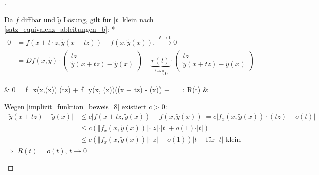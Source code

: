 \begin{proof}[]
\begin{enumerate}[label={\alph*)}]
		Da $f$ \gls{diffbar} und $\tilde{y}$ Lösung, gilt für $\vert t \vert$ klein nach  \ref{satz_equivalenz_ableitungen_b}: {\zeroAmsmathAlignVSpaces**\begin{align*}
			0 &= f(x + t\cdot z, \tilde{y}(x + tz)) - f(x,\tilde{y}(x)), \, \xrightarrow{t\to 0}0 \\
			&= Df(x,\tilde{y})\cdot \begin{pmatrix}tz \\ \tilde{y}(x+tz) - \tilde{y}(x)\end{pmatrix} + \underbrace{r(t)}_{\xrightarrow{t\to 0} 0}\cdot \begin{pmatrix}
				tz \\ \tilde{y}(x + tz) - \tilde{y}(x)
			\end{pmatrix}
		\end{align*}}
		{\zeroAmsmathAlignVSpaces\begin{flalign}
			\Rightarrow\;\; & 0 = f_x(x,(x)) \cdot(tz) + f_y(x, (x))\cdot ((x + tz) - (x)) + _{=: R(t)} &
		\end{flalign}}
		Wegen \eqref{implizit_funktion_beweis_8} existiert $c > 0$: \begin{align*}
			\vert \tilde{y}(x+tz) - \tilde{y}(x)\vert &\le c\vert f(x+tz, \tilde{y}(x)) - f(x,\tilde{y}(x))\vert = c\vert f_x(x,\tilde{y}(x))\cdot (tz) + o(t)\vert \\
			&\le c\left( \Vert f_x(x,\tilde{y}(x))\Vert \cdot \vert z \vert \cdot \vert t \vert + o(1)\cdot\vert t\vert\right) \\
			&\le c\left(\Vert f_x(x,\tilde{y}(x))\Vert\cdot\vert z\vert + o(1)\right)\vert t \vert \quad\text{für $\vert t \vert$ klein}
		\end{align*}
		$\Rightarrow$ $R(t) = o(t)$, $t\to 0$
		

\end{enumerate}
\end{proof}
